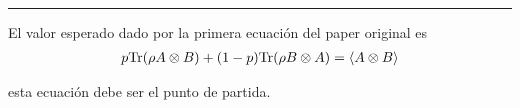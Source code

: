 \documentclass[12pt,oneside]{book}\raggedbottom{}
\begin{document}
\theoremstyle{Tema} \newtheorem{Tema}{Tema} %
\theoremstyle{Tema} \newtheorem{serie}{Serie}              %
\theoremstyle{Tema} \newtheorem{ejercicio}{Ejercicio}    %


{
\renewcommand{\headrulewidth}{1.5pt}
\fancyhead[R]{
			}
\fancyhead[L]{ 
	}
}

{
\renewcommand{\headrulewidth}{0.8 pt}
\fancyhead[R]{
			\emph{\myName{} $-$ \myCourse{}} %
			}
\fancyhead[L]{}  
\fancyfoot[C]{}
\fancyfoot[R]{\thepage}
}

\date{}
\setlength{\headheight}{0.5in} %

\pagestyle{allStyle}

\thispagestyle{firststyle}
\begin{center}
\LARGE
\textsc{\myName}\\%
\bigskip
\hrule height 1.5pt
\end{center}
\setcounter{chapter}{1}

El valor esperado dado por la primera ecuación del paper original es 
\begin{equation}\label{ecuacion1paper}\begin{split}
    p{\rm Tr}(\rho A\otimes B)+(1-p){\rm Tr}(\rho B\otimes A)=    \langle A\otimes B\rangle
\end{split}\end{equation}		

esta ecuación debe ser el punto de partida.
\end{document}
